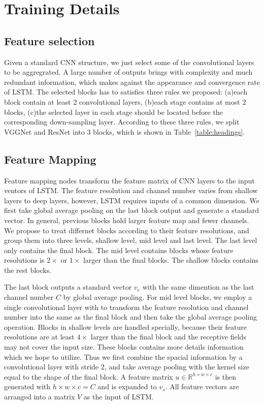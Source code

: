 \documentclass[runningheads]{llncs}
\begin{document}
\section{Training Details}
\subsection{Feature selection}
Given a standard CNN structure, we just select some of the convolutional layers to be aggregrated. A large number of outputs brings with complexity and much redundant information, which makes against the appearance and convergence rate of LSTM. The selected blocks has to satisfies three rules we proposed: (a)each block contain at least 2 convolutional layers, (b)each stage contains at most 2 blocks, (c)the selected layer in each stage should be located before the corresponding down-sampling layer. According to these three rules, we split VGGNet and ResNet into 3 blocks, which is shown in Table~\ref{table:headings}.
\subsection{Feature Mapping}

Feature mapping nodes transform the feature matrix of CNN layers to the input ventors of LSTM. The feature resolution and channel number varies from shallow layers to deep layers, however, LSTM requires inputs of a common dimension. We first take global average pooling on the last block output and generate a standard vector. In general, previous blocks hold larger feature map and fewer channels. We propose to treat differnet blocks according to their feature resolutions, and group them into three levels, shallow level, mid level and last level. The last level only contains the final block. The mid level contains blocks whose feature resolutions is $2\times$ or $1\times$ larger than the final blocks. The shallow blocks contains the rest blocks. 

The last block outputs a standard vector $v_e$ with the same dimention as the last channel number $C$ by global average pooling. For mid level blocks, we employ a single convolutional layer with to transform the feature resolution and channel number into the same as the final block and then take the global average pooling operation. Blocks in shallow levels are handled specially, because their feature resolutions are at least $4\times$ larger than the final block and the receptive fields may not cover the input size. These blocks contains more details information which we hope to utilize. Thus we first combine the spacial information by a convolutional layer with stride 2, and take average pooling with the kernel size equal to the shape of the final block. A feature matrix $u \in \mathbb{R}^{h\times w \times c}$ is then generated with $h\times w \times c = C$ and is expanded to $v_s$. All feature vectors are arranged into a matrix $V$ as the input of LSTM.
\end{document}

